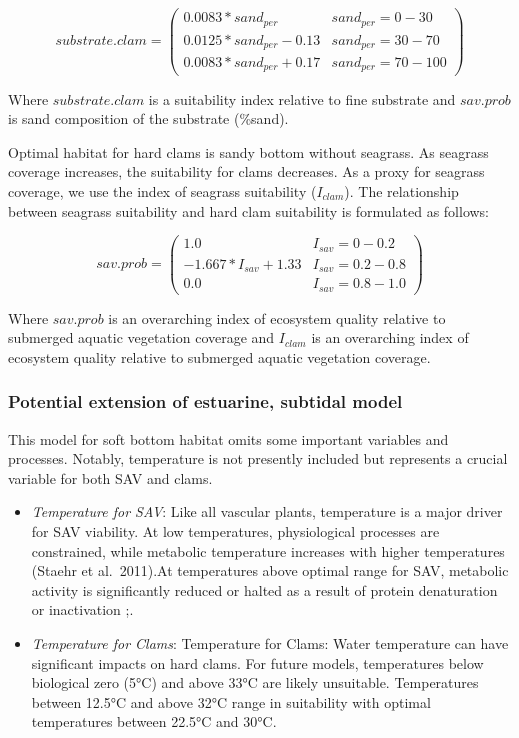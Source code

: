 \documentclass[
]{book}
\begin{document}
\[substrate.clam = \begin{pmatrix} 0.0083*sand_{per} & sand_{per}=0-30\\
0.0125*sand_{per}-0.13 & sand_{per}=30-70\\
0.0083*sand_{per}+0.17 & sand_{per}=70-100
\end{pmatrix}\]

Where \(substrate.clam\) is a suitability index relative to fine substrate and \(sav.prob\) is sand composition of the substrate (\%sand).

Optimal habitat for hard clams is sandy bottom without seagrass. As seagrass coverage increases, the suitability for clams decreases. As a proxy for seagrass coverage, we use the index of seagrass suitability (\(I_{clam}\)). The relationship between seagrass suitability and hard clam suitability is formulated as follows:

\[sav.prob = \begin{pmatrix} 1.0 & I_{sav}=0-0.2\\
-1.667*I_{sav}+1.33 & I_{sav}=0.2-0.8\\
0.0 & I_{sav}=0.8-1.0
\end{pmatrix}\]

Where \(sav.prob\) is an overarching index of ecosystem quality relative to submerged aquatic vegetation coverage and \(I_{clam}\) is an overarching index of ecosystem quality relative to submerged aquatic vegetation coverage.

\hypertarget{potential-extension-of-estuarine-subtidal-model}{%
\subsubsection{Potential extension of estuarine, subtidal model}\label{potential-extension-of-estuarine-subtidal-model}}

This model for soft bottom habitat omits some important variables and processes. Notably, temperature is not presently included but represents a crucial variable for both SAV and clams.

\begin{itemize}
\item
  \emph{Temperature for SAV}: Like all vascular plants, temperature is a major driver for SAV viability. At low temperatures, physiological processes are constrained, while metabolic temperature increases with higher temperatures (Staehr et al.~2011).At temperatures above optimal range for SAV, metabolic activity is significantly reduced or halted as a result of protein denaturation or inactivation \citep{atkin_thermal_2003};\citep{jensen_psi-k_2000}.
\item
  \emph{Temperature for Clams}: Temperature for Clams: Water temperature can have significant impacts on hard clams. For future models, temperatures below biological zero (5°C) and above 33°C are likely unsuitable. Temperatures between 12.5°C and above 32°C range in suitability with optimal temperatures between 22.5°C and 30°C.
\end{itemize}
\end{document}
